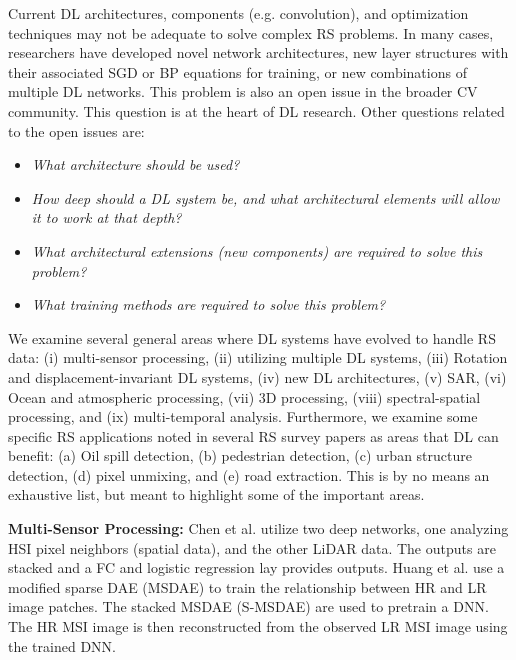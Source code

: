\documentclass[12pt]{spieman}
\begin{document}
\begin{spacing}{1}
Current DL architectures, components (e.g. convolution), and optimization techniques may not be adequate to solve complex RS problems. In many cases, researchers have developed novel network architectures, new layer structures with their associated SGD or BP equations for training, or new combinations of multiple DL networks. This problem is also an open issue in the broader CV community. This question is at the heart of DL research. Other questions related to the open issues are:

\begin{itemize}
    \setlength{\parskip}{0pt}
    \setlength{\itemsep}{0pt plus 1pt}
    \item \textit{What architecture should be used?}
    \item \textit{How deep should a DL system be, and what architectural elements will allow it to work at that depth?}
    \item \textit{What architectural extensions (new components) are required to solve this problem?}
    \item \textit{What training methods are required to solve this problem?}
\end{itemize}

We examine several general areas where DL systems have evolved to handle RS data: (i) multi-sensor processing, (ii) utilizing multiple DL systems, (iii) Rotation and displacement-invariant DL systems, (iv) new DL architectures, (v) SAR, (vi) Ocean and atmospheric processing, (vii) 3D processing,  (viii) spectral-spatial processing, and (ix) multi-temporal analysis. Furthermore, we examine some specific RS applications noted in several RS survey papers as areas that DL can benefit: (a) Oil spill detection, (b) pedestrian detection, (c) urban structure detection, (d) pixel unmixing, and (e) road extraction. This is by no means an exhaustive list, but meant to highlight some of the important areas.



\textbf{Multi-Sensor Processing:} Chen et al. \cite{Chen2016DeepFusion} utilize two deep networks, one analyzing HSI pixel neighbors (spatial data), and the other LiDAR data. The outputs are stacked and a FC and logistic regression lay provides outputs. Huang et al. \cite{huang2015new} use a modified sparse DAE (MSDAE) to train the relationship between HR and LR image patches. The stacked MSDAE (S-MSDAE) are used to pretrain a DNN. The HR MSI image is then reconstructed from the observed LR MSI image using the trained DNN.



\end{spacing}
\end{document}

